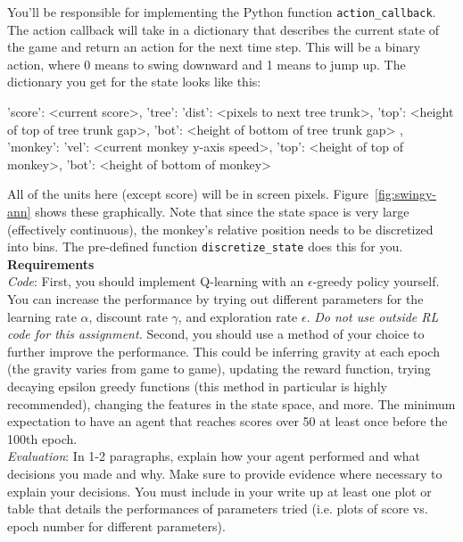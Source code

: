 \documentclass[submit]{../harvardml}
\begin{document}
\begin{problem}
    You'll be responsible for implementing the Python function  \verb|action_callback|. The action callback will take in a dictionary that describes the current state of the game and return an action for the next time step. This will be a binary action, where 0 means to swing downward and 1 means to jump up. The dictionary you get for the state looks like this:
    \begin{csv}
    { 'score': <current score>,
      'tree': { 'dist': <pixels to next tree trunk>,
                'top':  <height of top of tree trunk gap>,
                'bot':  <height of bottom of tree trunk gap> },
      'monkey': { 'vel': <current monkey y-axis speed>,
                  'top': <height of top of monkey>,
                  'bot': <height of bottom of monkey> }}
    \end{csv}
    All of the units here (except score) will be in screen pixels. Figure~\ref{fig:swingy-ann} shows these graphically. Note that since the state space is very large (effectively continuous), the monkey's relative position needs to be discretized into bins. The pre-defined function \verb|discretize_state| does this for you. \\

    \noindent \textbf{Requirements}
    \\
    \noindent \textit{Code}: First, you should implement Q-learning with an
    $\epsilon$-greedy policy yourself. You can increase the performance by
    trying out different parameters for the learning rate $\alpha$,
    discount rate $\gamma$, and exploration rate $\epsilon$. \emph{Do not use outside RL code for this assignment.} Second, you should use a method of your choice to further improve the performance. This could be inferring gravity at each epoch (the gravity varies from game to game), updating the reward function, trying decaying epsilon greedy functions (this method in particular is highly recommended), changing the features in the state space, and more. The minimum expectation to have an agent that reaches scores over 50 at least once before the 100th epoch. \\
    
    \noindent \textit{Evaluation}: In 1-2 paragraphs, explain how your agent performed and what decisions you made and why. Make sure to provide evidence where necessary to explain your decisions. You must include in your write up at least one plot or table that details the performances of parameters tried (i.e. plots of score vs. epoch number for different parameters). \\
    

\end{problem}
\end{document}
